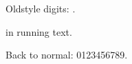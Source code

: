 \documentclass{article}
\begin{document}
Oldstyle digits: {}.

 in running text.

Back to normal: 0123456789.
\end{document}

